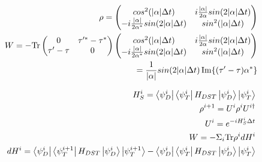 \documentclass{article}
\begin{document}
\begin{align*}
		\rho = \begin{pmatrix}
		cos^2(\abs{\alpha} \Delta t) & i\frac{\abs{\alpha}}{2\alpha} sin(2\abs{\alpha} \Delta t) \\
		-i\frac{\abs{\alpha}}{2\alpha^*} sin(2\abs{\alpha} \Delta t) & sin^2(\abs{\alpha} \Delta t)
		\end{pmatrix} \\
		W = -\mathrm{Tr} \begin{pmatrix}
		0 & \tau'^* - \tau^* \\
		\tau' - \tau & 0 \\
		\end{pmatrix}
		\begin{pmatrix}
		cos^2(\abs{\alpha} \Delta t) & i\frac{\abs{\alpha}}{2\alpha} sin(2\abs{\alpha} \Delta t) \\
		-i\frac{\abs{\alpha}}{2\alpha^*} sin(2\abs{\alpha} \Delta t) & sin^2(\abs{\alpha} \Delta t)
		\end{pmatrix} \\
		= \frac{1}{\abs{\alpha}} sin(2\abs{\alpha}\Delta t) \Im{(\tau' - \tau) \alpha^*}
	\end{align*}
	
	\begin{align*}
		H_S^i = \bra{\psi_D^i}\bra{\psi_T^i} H_{DST} \ket{\psi_D^i} \ket{\psi_T^i} \\
		\rho^{i+1} = U^i \rho^i U^{i\dagger} \\
		U^i = e^{-iH_S^i \Delta t} \\
		W = - \Sigma_i \mathrm{Tr} \rho^i dH^i \\
		dH^i = \bra{\psi_D^i}\bra{\psi_T^{i+1}} H_{DST} \ket{\psi_D^i} \ket{\psi_T^{i+1}} - \bra{\psi_D^i}\bra{\psi_T^i} H_{DST} \ket{\psi_D^i} \ket{\psi_T^i}
	\end{align*}
\end{document}
